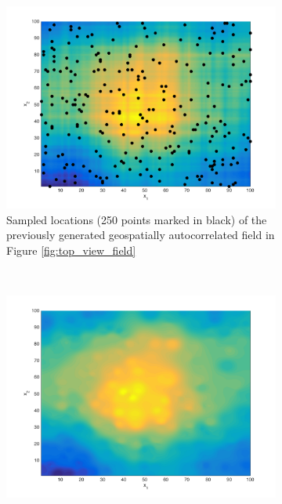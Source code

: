 \documentclass[11pt]{ucthesis}
\begin{document}
\begin{figure}[!]
    \centering
    \begin{subfigure}[t]{0.5\textwidth}
        \centering
        \includegraphics[width=\linewidth]{figures/sampled_generated_field.png}
        \captionsetup{skip=0.5\baselineskip, width=0.8\textwidth, size=footnotesize}
        \caption{Sampled locations (250 points marked in black) of the previously generated geospatially autocorrelated field in Figure \ref{fig:top_view_field}}
        \label{fig:samples}
    \end{subfigure}%
    ~ 
    \begin{subfigure}[t]{0.5\textwidth}
        \centering
        \includegraphics[width=\linewidth]{figures/idw_predicted_field.png}

\end{subfigure}
\end{figure}
\end{document}
